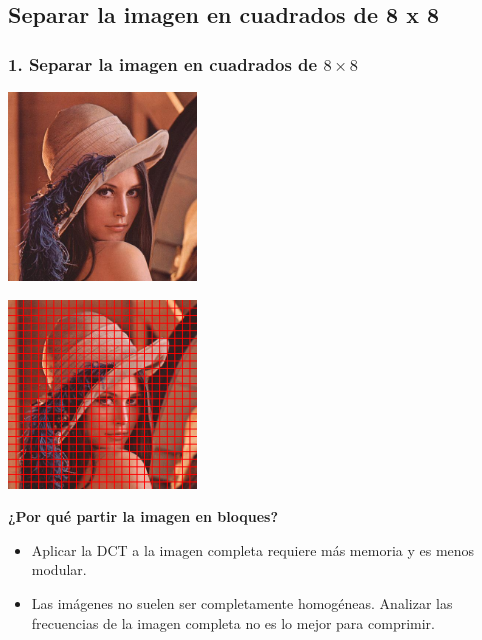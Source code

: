 \documentclass{beamer}
\begin{document}
\subsection{Separar la imagen en cuadrados de 8 x 8}

\begin{frame}
    \frametitle{1. Separar la imagen en cuadrados de $8 \times 8$}
    \begin{minipage}[t]{0.48\linewidth}
        \includegraphics[width=5cm, height=5cm]{fig/lena.jpg}
    \end{minipage}
    \hfill
    \begin{minipage}[t]{0.48\linewidth}
        \includegraphics[width=5cm, height=5cm]{fig/lena_blocks.png}
    \end{minipage}
\end{frame}

\begin{frame}
    \textbf{¿Por qué partir la imagen en bloques?}
    \begin{itemize}
        \item Aplicar la DCT a la imagen completa requiere más memoria y es menos modular. %
        \item Las imágenes no suelen ser completamente homogéneas. Analizar las frecuencias de la imagen completa no es lo mejor para comprimir.
    \end{itemize}
\end{frame}
\end{document}
